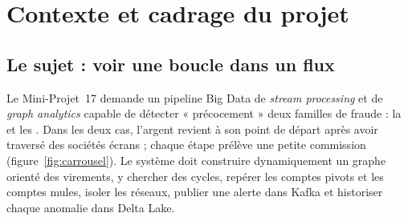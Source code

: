 \chapter{Contexte et cadrage du projet}
\label{ch:contexte}

\section{Le sujet : voir une boucle dans un flux}
Le Mini-Projet~17 demande un pipeline Big Data de \emph{stream processing} et
de \emph{graph analytics} capable de détecter « précocement » deux familles de
fraude : la  et les . Dans les deux cas, l'argent revient à son point de
départ après avoir traversé des sociétés écrans ; chaque étape prélève une
petite commission (figure~\ref{fig:carrousel}). Le système doit construire
dynamiquement un graphe orienté des virements, y chercher des cycles, repérer
les comptes pivots et les comptes mules, isoler les réseaux, publier une
alerte dans Kafka et historiser chaque anomalie dans Delta Lake.


